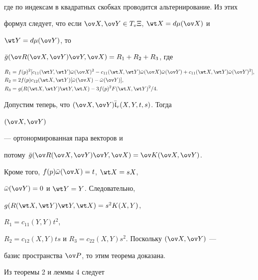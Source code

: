 \begin{pf}
\begin{align*}
\end{align*} 


где по индексам в квадратных скобках проводится альтернирование. Из этих 


формул следует, что если $\ov X,\ov Y\in T_v\Xi$, $\wt X=d\mu(\ov X)$ и 


$\wt Y=d\mu(\ov Y)$, то 


$\Bar g(\ov R(\ov X,\ov Y)\ov Y,\ov X)=R_1+R_2+R_3$, где 


\begin{align*} 


R_1&=f(p)^2[c_{11}(\wt Y,\wt Y)\Bar\omega(\ov X)^2- 


c_{11}(\wt X,\wt Y)\Bar\omega(\ov X)\Bar\omega(\ov Y)+ 


c_{11}(\wt X,\wt Y)\Bar\omega(\ov Y)^2],\\ 


R_2&=2f(p)c_{12}(\wt X,\wt Y)[\Bar\omega(\ov X)-\Bar\omega(\ov Y)],\\ 


R_3&=g(R(\wt X,\wt Y)\wt Y,\wt X)-3f(p)^2F(\wt X,\wt Y)^2/4. 


\end{align*} 


Допустим теперь, что $(\ov X,\ov Y)\Bar{\frak l}_v(X,Y,t,s)$. Тогда 


$(\ov X,\ov Y)$ 


--- ортонормированная пара векторов и 


потому $\Bar g(\ov R(\ov X,\ov Y)\ov Y,\ov X)=\ov K(\ov X,\ov Y)$. 


Кроме того, $f(p)\Bar\omega(\ov X)=t$, $\wt X=sX$, 


$\Bar\omega(\ov Y)=0$ и $\wt Y =Y$. Следовательно, 


$g(R(\wt X,\wt Y)\wt Y,\wt X)=s^2K(X,Y)$, 


$R_1=c_{11}(Y,Y)t^2$, 


$R_2=c_{12}(X,Y)ts$ и $R_3=c_{22}(X,Y)s^2$. Поскольку $(\ov X,\ov Y)$ --- 


базис пространства $\ov P$, то этим теорема доказана. 


\end{pf} 


 


Из теоремы 2 и леммы 4 следует 


 


